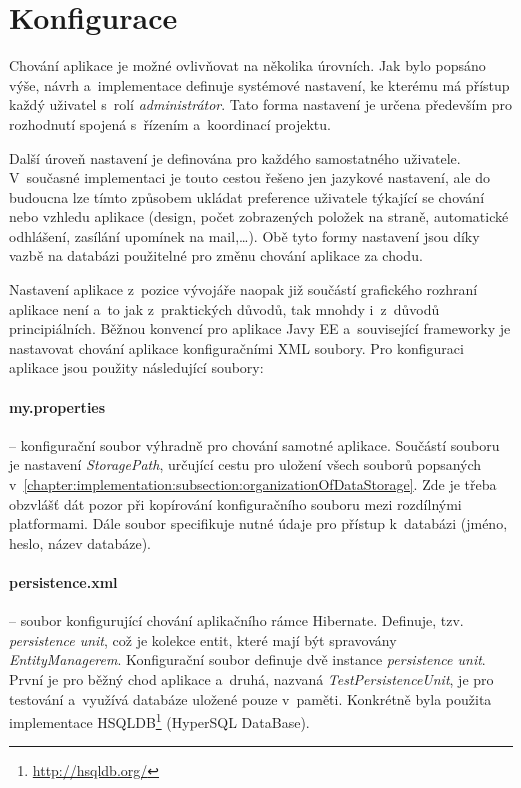 \documentclass[11pt, draft, oneside]{fithesis2}
\begin{document}
\section{Konfigurace}\label{chapter:implementation:section:konfiguration}
Chování aplikace je možné ovlivňovat na několika úrovních. Jak bylo popsáno výše, návrh a~implementace definuje systémové nastavení, ke kterému má přístup každý uživatel s~rolí \textit{administrátor}. Tato forma nastavení je určena především pro rozhodnutí spojená s~řízením a~koordinací projektu. 

Další úroveň nastavení je definována pro každého samostatného uživatele. V~současné implementaci je touto cestou řešeno jen jazykové nastavení, ale do budoucna lze tímto způsobem ukládat preference uživatele týkající se chování nebo vzhledu aplikace (design, počet zobrazených položek na straně, automatické odhlášení, zasílání upomínek na mail,\ldots).
Obě tyto formy nastavení jsou díky vazbě na databázi použitelné pro změnu chování aplikace za chodu. 

Nastavení aplikace z~pozice vývojáře naopak již součástí grafického rozhraní aplikace není a~to jak z~praktických důvodů, tak mnohdy i~z~důvodů principiálních. Běžnou konvencí pro aplikace Javy EE a~související frameworky je nastavovat chování aplikace konfiguračními XML soubory. Pro konfiguraci aplikace jsou použity následující soubory:

\paragraph*{my.properties} -- konfigurační soubor výhradně pro chování samotné aplikace. Součástí souboru je nastavení \textit{StoragePath}, určující cestu pro uložení všech souborů popsaných v~\ref{chapter:implementation:subsection:organizationOfDataStorage}. Zde je třeba obzvlášť dát pozor při kopírování konfiguračního souboru mezi rozdílnými platformami. 
Dále soubor specifikuje nutné údaje pro přístup k~databázi (jméno, heslo, název databáze).

\paragraph*{persistence.xml} -- soubor konfigurující chování aplikačního rámce Hibernate. Definuje, tzv. \textit{persistence unit}, což je kolekce entit, které mají být spravovány \textit{EntityManagerem}.
Konfigurační soubor definuje dvě instance \textit{persistence unit}. První je pro běžný chod aplikace a~druhá, nazvaná \textit{TestPersistenceUnit}, je pro testování a~využívá databáze uložené pouze v~paměti.
Konkrétně byla použita implementace HSQLDB\footnote{\url{http://hsqldb.org/}} (HyperSQL DataBase).
\end{document}
